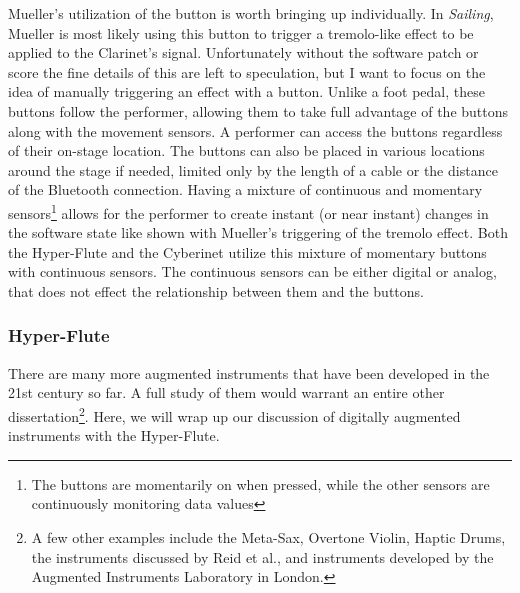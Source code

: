 Mueller's utilization of the button is worth bringing up individually. In \textit{Sailing}, Mueller is most likely using this button to trigger a tremolo-like effect to be applied to the Clarinet's signal. Unfortunately without the software patch or score the fine details of this are left to speculation, but I want to focus on the idea of manually triggering an effect with a button. Unlike a foot pedal, these buttons follow the performer, allowing them to take full advantage of the buttons along with the movement sensors. A performer can access the buttons regardless of their on-stage location. The buttons can also be placed in various locations around the stage if needed, limited only by the length of a cable or the distance of the Bluetooth connection. Having a mixture of continuous and momentary sensors\footnote{The buttons are momentarily on when pressed, while the other sensors are continuously monitoring data values} allows for the performer to create instant (or near instant) changes in the software state like shown with Mueller's triggering of the tremolo effect. Both the Hyper-Flute and the Cyberinet utilize this mixture of momentary buttons with continuous sensors. The continuous sensors can be either digital or analog, that does not effect the relationship between them and the buttons.


\subsubsection{Hyper-Flute}

There are many more augmented instruments that have been developed in the 21st century so far. A full study of them would warrant an entire other dissertation\footnote{A few other examples include the Meta-Sax, Overtone Violin, Haptic Drums, the instruments discussed by Reid et al.\cite{reid2018}, and instruments developed by the Augmented Instruments Laboratory in London.}. Here, we will wrap up our discussion of digitally augmented instruments with the Hyper-Flute.

